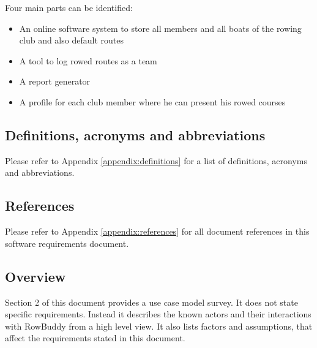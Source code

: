 	Four main parts can be identified:
	\begin{itemize}
		\item An online software system to store all members and all boats of the rowing club and also default routes
		\item A tool to log rowed routes as a team
		\item A report generator
		\item A profile for each club member where he can present his rowed courses
	\end{itemize}
	
	
	\subsection {Definitions, acronyms and abbreviations}
	Please refer to Appendix \ref{appendix:definitions} for a list of definitions, acronyms and abbreviations.
	
	
	\subsection{References}
	Please refer to Appendix \ref{appendix:references} for all document references in this software requirements document.
	
	\subsection{Overview}
	Section 2 of this document provides a use case model survey. It does not state specific requirements. Instead it describes the known actors and their interactions with RowBuddy from a high level view. It also lists factors and assumptions, that affect the requirements stated in this document.